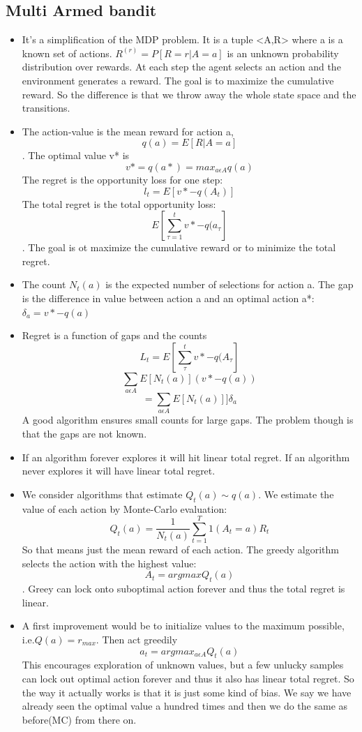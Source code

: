 \documentclass[a4paper]{article}
\begin{document}
    \subsection{Multi Armed bandit}
    \begin{itemize}
        \item It's a simplification of the MDP problem. It is a tuple <A,R> where a is a known set of actions. $R^(r)= P[R=r|A=a]$ is an unknown probability distribution over rewards. At each step the agent selects an action and the environment generates a reward. The goal is to maximize the cumulative reward. So the difference is that we throw away the whole state space and the transitions. 
        \item The action-value is the mean reward for action a,$$q(a) = E[R|A = a]$$. The optimal value v* is $$v*= q(a*) = max_{a \epsilon A}q(a) $$
        The regret is the opportunity loss for one step:
        $$l_t = E[v* - q(A_t)]$$
        The total regret is the  total opportunity loss: 
        $$E[\sum_{\tau = 1}^t v* - q(a_{\tau}]$$. The goal is ot maximize the cumulative reward or to minimize the total regret. 
        \item The count $N_t(a)$ is the expected number of selections for action a. The gap is the difference in value between action a and an optimal action a*: $\delta_a = v*-q(a)$
        \item Regret is a function of gaps and the counts $$L_t = E[\sum_{\tau}^t v* - q(A_{\tau}]$$
        $$\sum_{a \epsilon A} E[N_t(a)](v*-q(a))$$
        $$ = \sum_{a \epsilon A} E[N_t(a)]]\delta_a$$
        A good algorithm ensures small counts for large gaps. The problem though is that the gaps are not known. 
        \item If an algorithm forever explores it will hit linear total regret. If an algorithm never explores it will have linear total regret. 
        \item We consider algorithms that estimate $Q_t(a) \sim q(a)$. We estimate the value of each action by Monte-Carlo evaluation: $$Q_t(a) = \frac{1}{N_t(a) }\sum_{t=1}^T 1(A_t = a) R_t$$
        So that means just the mean reward of each action. The greedy algorithm selects the action with the highest value: $$A_t = argmax Q_t(a)$$. Greey can lock onto suboptimal action forever and thus the total regret is linear. 
        \item A first improvement would be to initialize values to the maximum possible, i.e.$Q(a) = r_{max}$. Then act greedily $$a_t = argmax_{a \epsilon A} Q_t(a)$$ This encourages exploration of unknown values, but a few unlucky samples can lock out optimal action forever and thus it also has linear total regret. So the way it actually works is that it is just some kind of bias. We say we have already seen the optimal value a hundred times and then we do the same as before(MC) from there on. 

\end{itemize}
\end{document}
